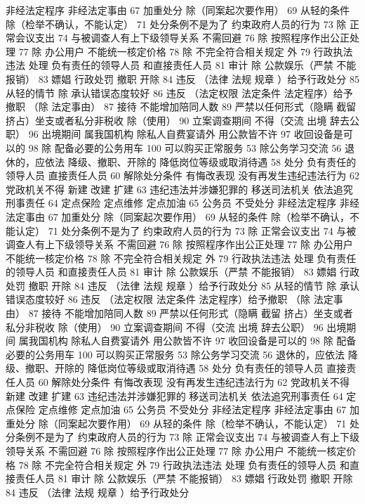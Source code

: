 \documentclass[11pt]{ctexart}
\begin{document}
非经法定程序
非经法定事由
67 加重处分
除（同案起次要作用）
69 从轻的条件
除（检举不确认，不能认定）
71 处分条例不是为了
约束政府人员的行为
73 除 正常会议支出
74 与被调查人有上下级领导关系 不需回避
76 除 按照程序作出公正处理
77 除 办公用户
不能统一核定价格
78 除 不完全符合相关规定 外
79 行政执法违法 处理
负有责任的领导人员
和直接责任人员
81 审计
除 公款娱乐（严禁 不能报销）
83 嫖娼 行政处罚
撤职 开除
84 违反 （法律 法规 规章 ）给予行政处分
85 从轻的情节
除 承认错误态度较好
86 违反 （法定权限 法定条件 法定程序）给予撤职
（除 法定事由）
87 接待 不能增加陪同人数
89 严禁以任何形式（隐瞒 截留 挤占）坐支或者私分非税收
除（使用）
90 立案调查期间 不得（交流 出境 辞去公职）
96 出境期间 属我国机构 除私人自费宴请外 用公款皆不许
97 收回设备是可以的
98 除 配备必要的公务用车
100 可以购买正常服务
53 除公务学习交流
56 退休的，应依法
降级、撤职、开除的 降低岗位等级或取消待遇
58 处分
负有责任的领导人员
直接责任人员
60 解除处分条件
有悔改表现
没有再发生违纪违法行为
62 党政机关不得
新建 改建 扩建
63 违纪违法并涉嫌犯罪的
移送司法机关
依法追究刑事责任
64 定点保险 定点维修 定点加油
65 公务员 不受处分
非经法定程序
非经法定事由
67 加重处分
除（同案起次要作用）
69 从轻的条件
除（检举不确认，不能认定）
71 处分条例不是为了
约束政府人员的行为
73 除 正常会议支出
74 与被调查人有上下级领导关系 不需回避
76 除 按照程序作出公正处理
77 除 办公用户
不能统一核定价格
78 除 不完全符合相关规定 外
79 行政执法违法 处理
负有责任的领导人员
和直接责任人员
81 审计
除 公款娱乐（严禁 不能报销）
83 嫖娼 行政处罚
撤职 开除
84 违反 （法律 法规 规章 ）给予行政处分
85 从轻的情节
除 承认错误态度较好
86 违反 （法定权限 法定条件 法定程序）给予撤职
（除 法定事由）
87 接待 不能增加陪同人数
89 严禁以任何形式（隐瞒 截留 挤占）坐支或者私分非税收
除（使用）
90 立案调查期间 不得（交流 出境 辞去公职）
96 出境期间 属我国机构 除私人自费宴请外 用公款皆不许
97 收回设备是可以的
98 除 配备必要的公务用车
100 可以购买正常服务
53 除公务学习交流
56 退休的，应依法
降级、撤职、开除的 降低岗位等级或取消待遇
58 处分
负有责任的领导人员
直接责任人员
60 解除处分条件
有悔改表现
没有再发生违纪违法行为
62 党政机关不得
新建 改建 扩建
63 违纪违法并涉嫌犯罪的
移送司法机关
依法追究刑事责任
64 定点保险 定点维修 定点加油
65 公务员 不受处分
非经法定程序
非经法定事由
67 加重处分
除（同案起次要作用）
69 从轻的条件
除（检举不确认，不能认定）
71 处分条例不是为了
约束政府人员的行为
73 除 正常会议支出
74 与被调查人有上下级领导关系 不需回避
76 除 按照程序作出公正处理
77 除 办公用户
不能统一核定价格
78 除 不完全符合相关规定 外
79 行政执法违法 处理
负有责任的领导人员
和直接责任人员
81 审计
除 公款娱乐（严禁 不能报销）
83 嫖娼 行政处罚
撤职 开除
84 违反 （法律 法规 规章 ）给予行政处分
\end{document}
